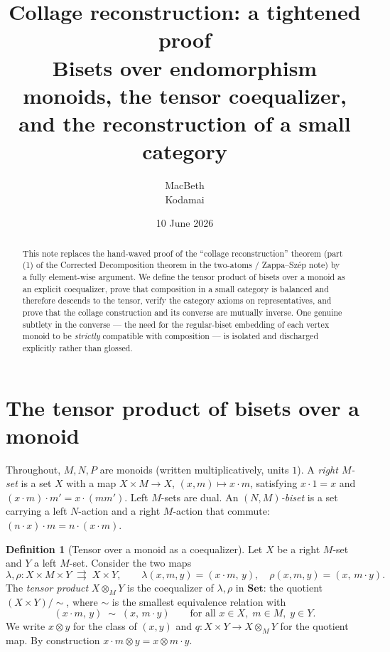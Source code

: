 \documentclass[11pt]{article}
\title{Collage reconstruction: a tightened proof\\
\large Bisets over endomorphism monoids, the tensor coequalizer,\\
and the reconstruction of a small category}
\author{MacBeth\\\small Kodamai}
\date{10 June 2026}
\theoremstyle{definition}
\newtheorem{definition}[theorem]{Definition}
\newcommand{\Set}{\mathbf{Set}}
\begin{document}
\maketitle

\begin{abstract}
This note replaces the hand-waved proof of the ``collage reconstruction''
theorem (part (1) of the Corrected Decomposition theorem in the two-atoms /
Zappa--Sz\'ep note) by a fully element-wise argument. We define the tensor
product of bisets over a monoid as an explicit coequalizer, prove that
composition in a small category is balanced and therefore descends to the
tensor, verify the category axioms on representatives, and prove that the
collage construction and its converse are mutually inverse. One genuine
subtlety in the converse --- the need for the regular-biset embedding of each
vertex monoid to be \emph{strictly} compatible with composition --- is
isolated and discharged explicitly rather than glossed.
\end{abstract}

\section{The tensor product of bisets over a monoid}

Throughout, $M,N,P$ are monoids (written multiplicatively, units $1$).
A \emph{right $M$-set} is a set $X$ with a map $X\times M\to X$,
$(x,m)\mapsto x\cdot m$, satisfying $x\cdot 1 = x$ and
$(x\cdot m)\cdot m' = x\cdot(mm')$. Left $M$-sets are dual. An
\emph{$(N,M)$-biset} is a set carrying a left $N$-action and a right
$M$-action that commute: $(n\cdot x)\cdot m = n\cdot(x\cdot m)$.

\begin{definition}[Tensor over a monoid as a coequalizer]\label{def:tensor}
Let $X$ be a right $M$-set and $Y$ a left $M$-set. Consider the two maps
\[
  \lambda,\rho : X\times M\times Y \;\rightrightarrows\; X\times Y,
  \qquad
  \lambda(x,m,y) = (x\cdot m,\, y),
  \quad
  \rho(x,m,y) = (x,\, m\cdot y).
\]
The \emph{tensor product} $X\otimes_M Y$ is the coequalizer of
$\lambda,\rho$ in $\Set$: the quotient $(X\times Y)/{\sim}$, where $\sim$ is
the smallest equivalence relation with
\[
  (x\cdot m,\, y) \;\sim\; (x,\, m\cdot y)
  \qquad\text{for all } x\in X,\; m\in M,\; y\in Y .
\]
We write $x\otimes y$ for the class of $(x,y)$ and
$q:X\times Y\to X\otimes_M Y$ for the quotient map. By construction
$x\cdot m\otimes y = x\otimes m\cdot y$.
\end{definition}
\end{document}

